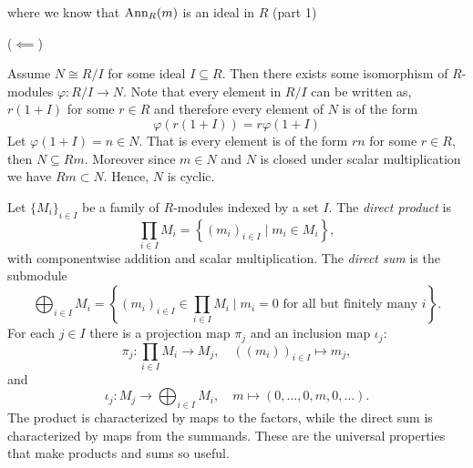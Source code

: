 \documentclass[Notebook.tex]{subfiles}
\begin{document}
\begin{solution}
\begin{enumerate}
            where we know that $\operatorname{\text{Ann}}_R(m)$ is an ideal in $R$ (part 1) 
            
            ($\impliedby$) 

            Assume $N \cong R/I$ for some ideal $I \subseteq R$. Then there exists some isomorphism of $R$-modules $\varphi: R/I \to N$. Note that every element in $R/I$ can be written as, $r(1 + I)$  for some $r \in R$ and therefore every element of $N$ is of the form
            \[\varphi(r(1 + I) )= r \varphi(1 + I) \] 
            Let $\varphi(1+I) = n \in N$. That is every element is of the form $rn$ for some $r \in R$, then $N \subseteq Rm$. Moreover since $m \in N$ and $N$ is closed under scalar multiplication we have $Rm \subset N$. Hence, $N$ is cyclic.  
        \end{enumerate}
    \end{solution}

    \newpage 
    \hrulefill

    Let $\{M_i\}_{i\in I}$ be a family of $R$-modules indexed by a set $I$. The \emph{direct product} is
    \[
    \prod_{i\in I}M_i=\left\{(m_i)_{i\in I}\mid m_i\in M_i\right\},
    \]
    with componentwise addition and scalar multiplication. The \emph{direct sum} is the submodule
    \[
    \bigoplus_{i\in I}M_i=\left\{(m_i)_{i\in I}\in \prod_{i\in I}M_i\mid m_i=0 \text{ for all but finitely many } i\right\}.
    \]
    For each $j \in I$ there is a projection map $\pi_j$ and an inclusion map $\iota_j$:
    \[
    \pi_j:\prod_{i\in I}M_i\to M_j,
    \quad
    ((m_i))_{i\in I}\longmapsto m_j,
    \] and \[
    \iota_j:M_j\to \bigoplus_{i\in I}M_i,
    \quad
    m\longmapsto (0,\ldots,0,m,0,\ldots).
    \]
    The product is characterized by maps to the factors, while the direct sum is characterized by maps from the summands. These are the universal properties that make products and sums so useful.

    \hrulefill

    \newpage 
\end{document}
